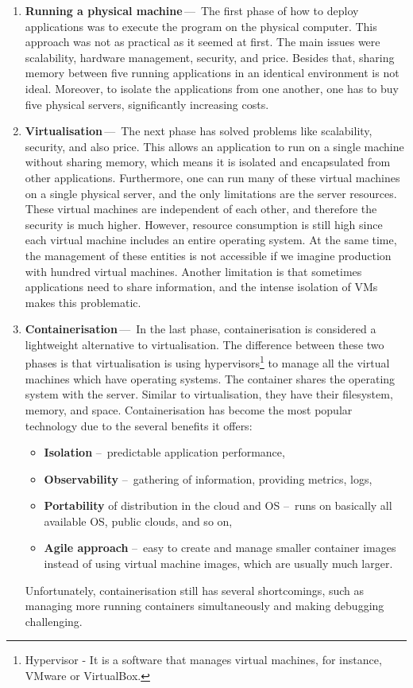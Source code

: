 \begin{enumerate}
    \item \textbf{Running a physical machine}\,---\, The first phase of how to deploy applications was to execute the program on the physical computer.
    This approach was not as practical as it seemed at first.
    The main issues were scalability, hardware management, security, and price.
    Besides that, sharing memory between five running applications in an identical environment is not ideal.
    Moreover, to isolate the applications from one another, one has to buy five physical servers, significantly increasing costs.

    \item \textbf{Virtualisation}\,---\, The next phase has solved problems like scalability, security, and also price.
    This allows an application to run on a single machine without sharing memory, which means it is isolated and encapsulated from other applications.
    Furthermore, one can run many of these virtual machines on a single physical server, and the only limitations are the server resources.
    These virtual machines are independent of each other, and therefore the security is much higher.
    However, resource consumption is still high since each virtual machine includes an entire operating system.
    At the same time, the management of these entities is not accessible if we imagine production with hundred virtual machines.
    Another limitation is that sometimes applications need to share information, and the intense isolation of VMs makes this problematic.

    \item \textbf{Containerisation}\,---\, In the last phase, containerisation is considered a lightweight alternative to virtualisation.
    The difference between these two phases is that virtualisation is using hypervisors\footnote{Hypervisor - It is a software that manages virtual machines, for instance, VMware or VirtualBox.} to manage all the virtual machines which have operating systems. The container shares the operating system with the server. Similar to virtualisation, they have their filesystem, memory, and space. Containerisation has become the most popular technology due to the several benefits it offers:
    \begin{itemize}[itemsep=1mm, parsep=0pt]
        \item \textbf{Isolation} \---\ predictable application performance,
        \item \textbf{Observability} \---\ gathering of information, providing metrics, logs,
        \item \textbf{Portability} of distribution in the cloud and OS \---\ runs on basically all available OS, public clouds, and so on,
        \item \textbf{Agile approach} \---\ easy to create and manage smaller container images instead of using virtual machine images, which are usually much larger.
    \end{itemize}
    Unfortunately, containerisation still has several shortcomings, such as managing more running containers simultaneously and making debugging challenging.


\end{enumerate}
